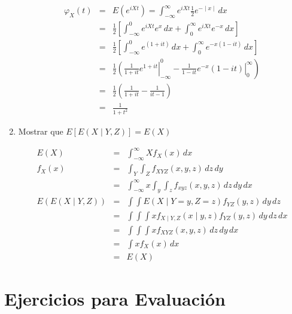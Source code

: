 \begin{enumerate}
\begin{eqnarray*}
\varphi_{X}\left(t \right)&=& E \left(e^{iXt}\right)= \int_{-\infty}^{\infty} e^{iXt} \frac{1}{2} e ^{- \mid x \mid}\, dx\\
&=& \frac{1}{2} \left[ \int_{-\infty}^{0} e^{iXt} e^x \, dx + \int _{0}^{\infty} e^{iXt}e^{-x}\, dx \right]\\
&=& \frac{1}{2} \left[ \int_{-\infty}^{0} e^{\left(1+it \right) } \, dx + \int _{0}^{\infty} e^{-x \left(1-it \right)}\, dx \right]\\
&=&\left. \frac{1}{2} \left( \frac{1}{1+it}e^{1+it}\right|_{-\infty}^{0} - \left.\frac{1}{1-it}e^{-x} \left( 1-it \right)\right|_{0}^{\infty}\right)\\
&=& \frac{1}{2} \left( \frac{1}{1+it} - \frac{1}{it-1} \right) \\
&=& \frac{1}{1+t^{2}}
\end{eqnarray*}
 
 
 \item  Mostrar que $E \left[E \left(X \mid Y,Z \right) \right]= E \left(X \right)$
 
\begin{eqnarray*}
E \left(X \right)&=& \int_{-\infty}^{\infty} X f_{X}\left( x\right) \, dx\\
f_{X} \left(x \right)&=& \int_{Y} \int_{Z} f_{XYZ} \left(x,y,z \right) \, dz\, dy  \\
&=& \int_{-\infty}^{\infty} x \int_{y} \int_{z} f_{xyz} \left(x,y,z \right) \, dz \, dy \, dx\\
E \left( E \left(X\mid Y,Z \right)\right)&=& \int \int E \left(X \mid Y=y, Z=z \right)f_{YZ} \left(y,z \right) \, dy \, dz\\
&=& \int \int \int x f_{X\mid Y,Z} \left( x\mid y,z\right)f_{YZ} \left(y,z \right) \, dy\, dz \, dx\\
&=& \int \int \int xf_{XYZ} \left(x,y,z \right)\,dz\,dy\,dx\\
&=& \int xf_{X} \left(x \right) \, dx\\
&=& E \left(X \right)
\end{eqnarray*} 

\end{enumerate}
\section{Ejercicios para  Evaluaci\'on}

